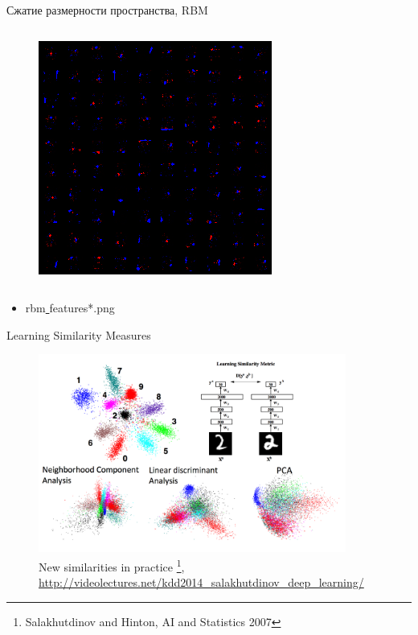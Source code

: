 \documentclass[10pt]{beamer}
\begin{document}
\begin{frame}{Сжатие размерности пространства, RBM}
\begin{columns}
	\begin{figure}[h!]
		\centering
  		\includegraphics[width=1\textwidth]{images/rbm2.png}
	\end{figure} 
	
\end{columns}

\begin{itemize}
	\item rbm\underline{ }features*.png
\end{itemize}

\end{frame}


\begin{frame}{Learning	Similarity	Measures}

\begin{figure}[h!]
	\centering
	\includegraphics[width=0.9\textwidth]{images/learn_sim.png}
	\caption{New similarities in practice \footnote{Salakhutdinov and Hinton, AI and Statistics 2007},\\ \url{http://videolectures.net/kdd2014_salakhutdinov_deep_learning/}}
\end{figure} 

\end{frame}
\end{document}
